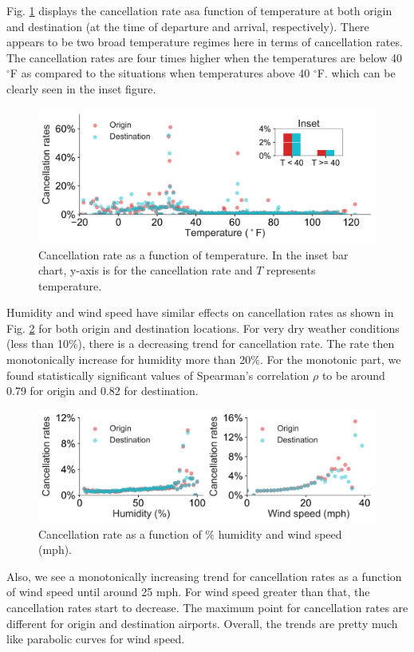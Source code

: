 \documentclass[12pt]{article}
\begin{document}
Fig. \ref{fig:tempcanrate} displays the cancellation rate asa function of temperature at both origin and destination (at the time of departure and arrival, respectively). There appears to be two broad temperature regimes here in terms of cancellation rates. The cancellation rates are four times higher when the temperatures are below 40 $^\circ$F as compared to the situations when temperatures above 40 $^\circ$F. which can be clearly seen in the inset figure. 
\begin{figure}[h!]
\begin{center}
\includegraphics[width=6in]{temperature_canrate.pdf}
\end{center}
\caption{\label{fig:tempcanrate}
Cancellation rate as a function of temperature. In the inset bar chart, y-axis is for the cancellation rate and $T$ represents temperature.}
\end{figure}
Humidity and wind speed have similar effects on cancellation rates as shown in Fig. \ref{fig:humwindcanrate} for both origin and destination locations. For very dry weather conditions (less than 10$\%$), there is a decreasing trend for cancellation rate. The rate then monotonically increase for humidity more than 20$\%$. For the monotonic part, we found statistically significant values of Spearman's correlation $\rho$ to be around 0.79 for origin and 0.82 for destination. 
\begin{figure}[h!]
\begin{center}
\includegraphics[width=6in]{humidity_windspeed_canrate.pdf}
\end{center}
\caption{\label{fig:humwindcanrate}
Cancellation rate as a function of $\%$ humidity and wind speed (mph).}
\end{figure}
Also, we see a monotonically increasing trend for cancellation rates as a function of wind speed until around 25 mph. For wind speed greater than that, the cancellation rates start to decrease. The maximum point for cancellation rates are different for origin and destination airports. Overall, the trends are pretty much like parabolic curves for wind speed.
\end{document}
